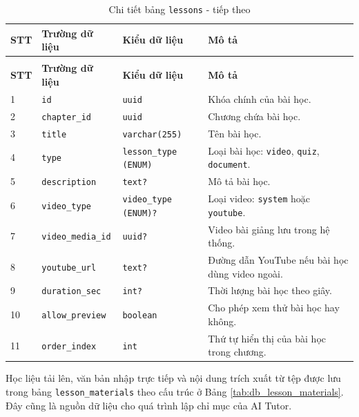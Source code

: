 \documentclass[../DoAn.tex]{subfiles}
\begin{document}
{\begin{longtable}{|p{}|p{}|p{}|p{}|}
\caption{Chi tiết bảng \texttt{lessons}}
\label{tab:db_lessons}\\
\hline
\textbf{STT} & \textbf{Trường dữ liệu} & \textbf{Kiểu dữ liệu} & \textbf{Mô tả} \\ \hline
\endfirsthead
\caption[]{Chi tiết bảng \texttt{lessons} - tiếp theo}\\
\hline
\textbf{STT} & \textbf{Trường dữ liệu} & \textbf{Kiểu dữ liệu} & \textbf{Mô tả} \\ \hline
\endhead
1 & \texttt{id} & \texttt{uuid} & Khóa chính của bài học. \\ \hline
2 & \texttt{chapter\_id} & \texttt{uuid} & Chương chứa bài học. \\ \hline
3 & \texttt{title} & \texttt{varchar(255)} & Tên bài học. \\ \hline
4 & \texttt{type} & \texttt{lesson\_type (ENUM)} & Loại bài học: \texttt{video}, \texttt{quiz}, \texttt{document}. \\ \hline
5 & \texttt{description} & \texttt{text?} & Mô tả bài học. \\ \hline
6 & \texttt{video\_type} & \texttt{video\_type (ENUM)?} & Loại video: \texttt{system} hoặc \texttt{youtube}. \\ \hline
7 & \texttt{video\_media\_id} & \texttt{uuid?} & Video bài giảng lưu trong hệ thống. \\ \hline
8 & \texttt{youtube\_url} & \texttt{text?} & Đường dẫn YouTube nếu bài học dùng video ngoài. \\ \hline
9 & \texttt{duration\_sec} & \texttt{int?} & Thời lượng bài học theo giây. \\ \hline
10 & \texttt{allow\_preview} & \texttt{boolean} & Cho phép xem thử bài học hay không. \\ \hline
11 & \texttt{order\_index} & \texttt{int} & Thứ tự hiển thị của bài học trong chương. \\ \hline
\end{longtable}

Học liệu tải lên, văn bản nhập trực tiếp và nội dung trích xuất từ tệp được lưu trong bảng \texttt{lesson\_materials} theo cấu trúc ở Bảng \ref{tab:db_lesson_materials}. Đây cũng là nguồn dữ liệu cho quá trình lập chỉ mục của AI Tutor.

}
\end{document}
